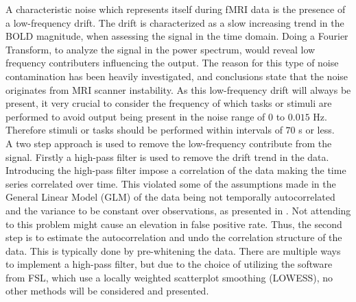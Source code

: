 A characteristic noise which represents itself during fMRI data is the presence of a low-frequency drift. The drift is characterized as a slow increasing trend in the BOLD magnitude, when assessing the signal in the time domain. Doing a Fourier Transform, to analyze the signal in the power spectrum, would reveal low frequency contributers influencing the output. The reason for this type of noise contamination has been heavily investigated, and conclusions state that the noise originates from MRI scanner instability. As this low-frequency drift will always be present, it very crucial to consider the frequency of which tasks or stimuli are performed to avoid output being present in the noise range of $0$ to $0.015$ Hz. Therefore stimuli or tasks should be performed within intervals of $70$ s or less. \cite{Poldrack2011} \\
A two step approach is used to remove the low-frequency contribute from the signal. Firstly a high-pass filter is used to remove the drift trend in the data. Introducing the high-pass filter impose a correlation of the data making the time series correlated over time. This violated some of the assumptions made in the General Linear Model (GLM) of the data being not temporally autocorrelated and the variance to be constant over observations, as presented in . Not attending to this problem might cause an elevation in false positive rate. Thus, the second step is to estimate the autocorrelation and undo the correlation structure of the data. This is typically done by pre-whitening the data. There are multiple ways to implement a high-pass filter, but due to the choice of utilizing the software from FSL, which use a locally weighted scatterplot smoothing (LOWESS), no other methods will be considered and presented. \cite{Poldrack2011} 